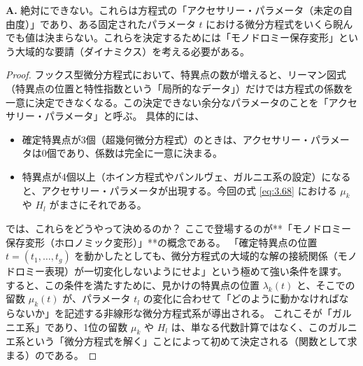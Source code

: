 \begin{Q}
\textbf{A.} 絶対にできない。これらは方程式の「アクセサリー・パラメータ（未定の自由度）」であり、ある固定されたパラメータ $t$ における微分方程式をいくら睨んでも値は決まらない。これらを決定するためには「モノドロミー保存変形」という大域的な要請（ダイナミクス）を考える必要がある。

\begin{proof}
フックス型微分方程式において、特異点の数が増えると、リーマン図式（特異点の位置と特性指数という「局所的なデータ」）だけでは方程式の係数を一意に決定できなくなる。この決定できない余分なパラメータのことを「アクセサリー・パラメータ」と呼ぶ。
具体的には、
\begin{itemize}
    \item 確定特異点が3個（超幾何微分方程式）のときは、アクセサリー・パラメータは0個であり、係数は完全に一意に決まる。
    \item 特異点が4個以上（ホイン方程式やパンルヴェ、ガルニエ系の設定）になると、アクセサリー・パラメータが出現する。今回の式 \eqref{eq:3.68} における $\mu_k$ や $H_l$ がまさにそれである。
\end{itemize}
では、これらをどうやって決めるのか？
ここで登場するのが**「モノドロミー保存変形（ホロノミック変形）」**の概念である。
「確定特異点の位置 $t = (t_1, \dots, t_g)$ を動かしたとしても、微分方程式の大域的な解の接続関係（モノドロミー表現）が一切変化しないようにせよ」という極めて強い条件を課す。
すると、この条件を満たすために、見かけの特異点の位置 $\lambda_k(t)$ と、そこでの留数 $\mu_k(t)$ が、パラメータ $t_l$ の変化に合わせて「どのように動かなければならないか」を記述する非線形な微分方程式系が導出される。
これこそが「ガルニエ系」であり、1位の留数 $\mu_k$ や $H_l$ は、単なる代数計算ではなく、このガルニエ系という「微分方程式を解く」ことによって初めて決定される（関数として求まる）のである。
\end{proof}
\end{Q}

